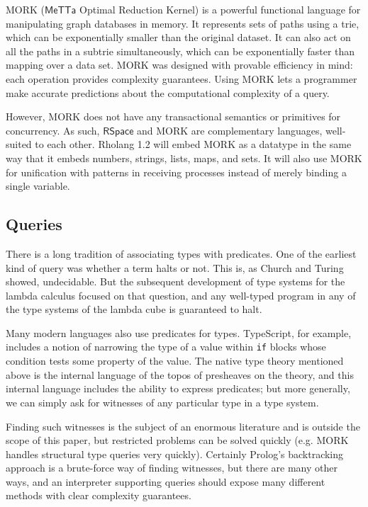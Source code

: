 \documentclass{article}
\newcommand{\RS}{\mathsf{RSpace}}
\begin{document}
MORK ($\mathsf{MeTTa}$ Optimal Reduction Kernel) is a powerful functional language for manipulating graph databases in memory. It represents sets of paths using a trie, which can be exponentially smaller than the original dataset.  It can also act on all the paths in a subtrie simultaneously, which can be exponentially faster than mapping over a data set.  MORK was designed with provable efficiency in mind: each operation provides complexity guarantees.  Using MORK lets a programmer make accurate predictions about the computational complexity of a query.

However, MORK does not have any transactional semantics or primitives for concurrency.  As such, $\RS$ and MORK are complementary languages, well-suited to each other.  Rholang 1.2 will embed MORK as a datatype in the same way that it embeds numbers, strings, lists, maps, and sets.  It will also use MORK for unification with patterns in receiving processes instead of merely binding a single variable.

\subsection{Queries}
\label{Queries}

There is a long tradition of associating types with predicates.  One of the earliest kind of query was whether a term halts or not.  This is, as Church and Turing showed, undecidable.  But the subsequent development of type systems for the lambda calculus focused on that question, and any well-typed program in any of the type systems of the lambda cube is guaranteed to halt.

Many modern languages also use predicates for types.  TypeScript, for example, includes a notion of narrowing the type of a value within \verb+if+ blocks whose condition tests some property of the value.  The native type theory mentioned above is the internal language of the topos of presheaves on the theory, and this internal language includes the ability to express predicates; but more generally, we can simply ask for witnesses of any particular type in a type system.  

Finding such witnesses is the subject of an enormous literature and is outside the scope of this paper, but restricted problems can be solved quickly (e.g. MORK handles structural type queries very quickly).  Certainly Prolog's backtracking approach is a brute-force way of finding witnesses, but there are many other ways, and an interpreter supporting queries should expose many different methods with clear complexity guarantees.
\end{document}
